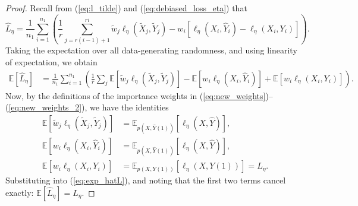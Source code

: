 \documentclass[10pt,a4paper]{amsart}
\begin{document}
\begin{proof}
    Recall from (\ref{eq:l_tilde}) and (\ref{eq:debiased_loss_eta}) that
    \[
    \hat{L}_\eta = \frac{1}{n_1} \sum_{i=1}^{n_1} \left( \frac{1}{r} \sum_{j=r(i-1)+1}^{ri} \tilde{w}_j \ell_\eta(\tilde{X}_j, \tilde{Y}_j)
    - w_i \left[\ell_\eta(X_i, \hat{Y}_i) - \ell_\eta(X_i, Y_i)\right] \right).
    \]
    Taking the expectation over all data-generating randomness, and using linearity of expectation, we obtain
    \begin{align}
        \mathbb{E}[\hat{L}_\eta] &= \frac{1}{n_1} \sum_{i=1}^{n_1} \left( \frac{1}{r} \sum_{j} \mathbb{E}\left[\tilde{w}_j \ell_\eta(\tilde{X}_j, \tilde{Y}_j)\right]
        - \mathbb{E}\left[w_i \ell_\eta(X_i, \hat{Y}_i)\right]
        + \mathbb{E}\left[w_i \ell_\eta(X_i, Y_i)\right] \right). \label{eq:exp_hatL}
    \end{align}
    Now, by the definitions of the importance weights in (\ref{eq:new_weights})--(\ref{eq:new_weights_2}), we have the identities
    \begin{align}
        \mathbb{E}\left[\tilde{w}_j \ell_\eta(\tilde{X}_j, \tilde{Y}_j)\right] &= \mathbb{E}_{p(X, \hat{Y}(1))} \left[\ell_\eta(X, \hat{Y})\right], \\
        \mathbb{E}\left[w_i \ell_\eta(X_i, \hat{Y}_i)\right] &= \mathbb{E}_{ p(X, \hat{Y}(1))} \left[\ell_\eta(X, \hat{Y})\right], \\
        \mathbb{E}\left[w_i \ell_\eta(X_i, Y_i)\right] &= \mathbb{E}_{p(X, Y(1))} \left[\ell_\eta(X, Y(1))\right] = L_\eta.
    \end{align}
    Substituting into (\ref{eq:exp_hatL}), and noting that the first two terms cancel exactly: $\mathbb{E}[\hat{L}_\eta] = L_\eta$. \qedhere
\end{proof}
\end{document}

